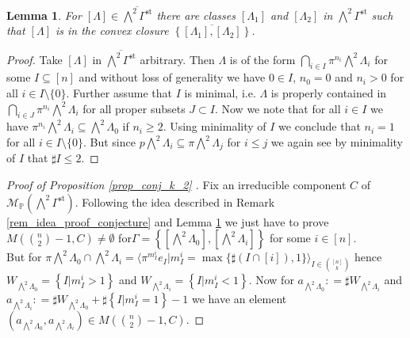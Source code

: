 \documentclass[11pt,a4paper]{amsart}
\newtheorem{lemma}[prop]{Lemma}
\theoremstyle{definition}
\theoremstyle{remark}
\newcommand{\Projsp}{\mathbb{P}}
\newcommand{\unif}{\pi}
\newcommand{\defeq}{\mathrel{\mathop:}=}
\newcommand{\M}[1]{\mathcal{M}_{\Projsp}\left(#1\right)}
\begin{document}
\begin{lemma}
\label{lem_convex_closure_k_2}
	For $[\Lambda]\in \overline{\bigwedge^2 \Gamma^{\mathrm{st}}}$ there are classes $[\Lambda_1]$ and $[\Lambda_2]$ in $\bigwedge^2 \Gamma^{\mathrm{st}}$ such that $[\Lambda]$ is in the convex closure $\overline{\left\{[\Lambda_1],[\Lambda_2]\right\}}$.
\end{lemma}

\begin{proof}
	Take $[\Lambda]$ in $\overline{\bigwedge^2 \Gamma^{\mathrm{st}}}$ arbitrary. Then $\Lambda$ is of the form $\bigcap_{i\in I} \unif^{n_i}\bigwedge^2\Lambda_i$ for some $I\subseteq[n]$ and without loss of generality we have $0\in I$, $n_0=0$ and $n_i> 0$ for all $i\in I\setminus\{0\}$. Further assume that $I$ is minimal, i.e. $\Lambda$ is properly contained in $\bigcap_{i\in J} \unif^{n_i}\bigwedge^2\Lambda_i$ for all proper subsets $J\subset I$. Now we note that for all $i\in I$ we have $\unif^{n_i}\bigwedge^2\Lambda_i\subseteq \bigwedge^2\Lambda_0$ if $n_i\geq 2$. Using minimality of $I$ we conclude that $n_i=1$ for all $i\in I\setminus \{0\}$. But since $p \bigwedge^2\Lambda_i\subseteq \unif\bigwedge^2\Lambda_j$ for $i\leq j$ we again see by minimality of $I$ that $\sharp I\leq 2$.
\end{proof}


\begin{proof}[Proof of Proposition \ref{prop_conj_k_2} ]
	Fix an irreducible component $C$ of $\M{\bigwedge^2\Gamma^{\mathrm{st}}}$. Following the idea described in Remark \ref{rem_idea_proof_conjecture} and Lemma \ref{lem_convex_closure_k_2} we just have to prove $M(\binom{n}{2}-1,C)\neq \emptyset$ for\linebreak $\Gamma=\left\{[\bigwedge^2 \Lambda_0],[\bigwedge^2\Lambda_i]\right\}$ for some $i\in [n]$.\\
	But for $\unif\bigwedge^2 \Lambda_0\cap\bigwedge^2\Lambda_i=\langle \unif^{m^{i}_I}e_I\vert m^{i}_I= \max\{\sharp(I\cap [i]),1\} \rangle_{I\in \binom{[n]}{k} }$ hence $W_{\bigwedge^2\Lambda_0}= \left\{I\vert m^i_{I}>1 \right\}$ and $W_{\bigwedge^2\Lambda_i}= \left\{I\vert m^i_{I}<1 \right\}$. Now for $a_{\bigwedge^2 \Lambda_0}\defeq \sharp W_{\bigwedge^2 \Lambda_i}$ and $a_{\bigwedge^2 \Lambda_i}\defeq \sharp W_{\bigwedge^2 \Lambda_0}+ \sharp\left\{I\vert m^i_{I}=1 \right\}-1$ we have an element $(a_{\bigwedge^2 \Lambda_0},a_{\bigwedge^2 \Lambda_i})\in M(\binom{n}{2}-1,C)$.

\end{proof}



\end{document}
